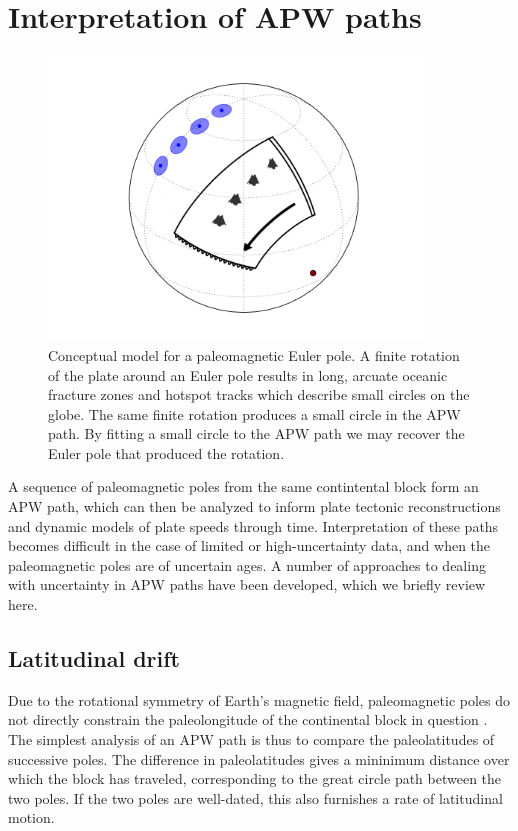 \documentclass[preprint,12pt,authoryear]{elsarticle}
\begin{document}
\section{Interpretation of APW paths}
\label{sec:apwp}
\begin{figure}
\includegraphics[width=0.9\textwidth]{figures/cartoon/paleomagnetic_euler_pole.png}
\caption[Conceptual model for a paleomagnetic Euler pole.]{Conceptual model for a paleomagnetic Euler pole. A finite rotation of the plate around an Euler pole results in long, arcuate oceanic fracture zones and hotspot tracks which describe small circles on the globe. The same finite rotation produces a small circle in the APW path. By fitting a small circle to the APW path we may recover the Euler pole that produced the rotation.}
\label{fig:pep}
\end{figure}
A sequence of paleomagnetic poles from the same contintental block form an APW path,
which can then be analyzed to inform plate tectonic reconstructions and dynamic models
of plate speeds through time. Interpretation of these paths becomes difficult in the
case of limited or high-uncertainty data, and when the paleomagnetic poles are of uncertain
ages. A number of approaches to dealing with uncertainty in APW paths have been developed,
which we briefly review here.

\subsection{Latitudinal drift}
Due to the rotational symmetry of Earth's magnetic field, paleomagnetic poles do not
directly constrain the paleolongitude of the continental block in question \citep{butler1992paleomagnetism}.
The simplest analysis of an APW path is thus to compare the paleolatitudes of successive poles.
The difference in paleolatitudes gives a mininimum distance over which the block has traveled, 
corresponding to the great circle path between the two poles. If the two poles are well-dated,
this also furnishes a rate of latitudinal motion.
\end{document}

